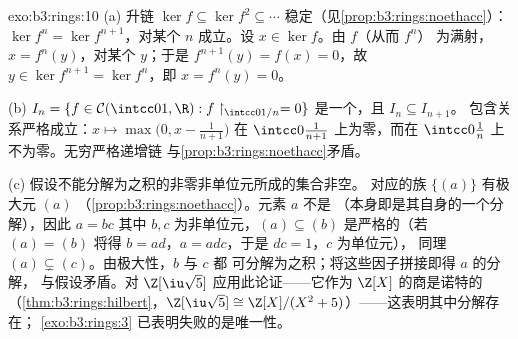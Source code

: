 \begin{solution}{exo:b3:rings:10}
(a) 升链 $\ker f \subseteq \ker f^2 \subseteq \cdots$
稳定（见\cref{prop:b3:rings:noethacc}）：$\ker f^n = \ker
f^{n+1}$，对某个 $n$ 成立。设 $x \in \ker f$。由 $f$（从而 $f^n$）
为满射，$x = f^n(y)$，对某个 $y$；于是 $f^{n+1}(y) = f(x) =
0$，故 $y \in \ker f^{n+1} = \ker f^n$，即 $x = f^n(y) = 0$。

(b) $I_n = \{f \in \mathcal C(\intcc01, \R) : f\restriction_{
\intcc0{1/n}} = 0\}$ 是一个，且 $I_n \subseteq I_{n+1}$。
包含关系严格成立：$x \mapsto \max\bigl(0, x -
\frac1{n+1}\bigr)$ 在 $\intcc0{\frac1{n+1}}$ 上为零，而在
$\intcc0{\frac1n}$ 上不为零。无穷严格递增链
与\cref{prop:b3:rings:noethacc}矛盾。

(c) 假设不能分解为之积的非零非单位元所成的集合非空。
对应的族
$\{(a)\}$ 有极大元 $(a)$
（\cref{prop:b3:rings:noethacc}）。元素 $a$ 不是
（本身即是其自身的一个分解），因此 $a = bc$
其中 $b, c$ 为非单位元，$(a) \subseteq (b)$ 是严格的（若 $(a) =
(b)$ 将得 $b = ad$，$a = adc$，于是 $dc = 1$，$c$ 为单位元），
同理 $(a) \subsetneq (c)$。由极大性，$b$ 与 $c$ 都
可分解为之积；将这些因子拼接即得 $a$ 的分解，
与假设矛盾。对 $\Z[\iu\sqrt5]$ 应用此论证——它作为
$\Z[X]$ 的商是诺特的（\cref{thm:b3:rings:hilbert}，$\Z[\iu\sqrt5]
\cong \Z[X]/(X^2+5)$）——这表明其中分解存在；
\cref{exo:b3:rings:3} 已表明失败的是唯一性。
\end{solution}

